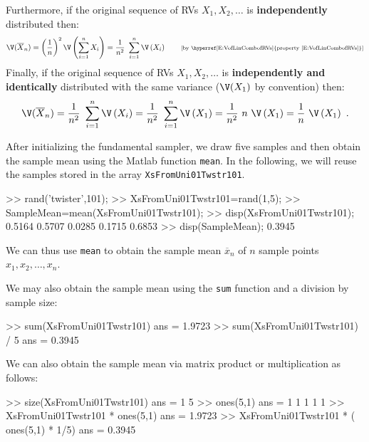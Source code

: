 Furthermore, if the original sequence of RVs $X_1,X_2,\ldots$ is {\bf independently} distributed then:
\begin{eqnarray}
\V(\overline{X}_n)
= \left( \frac{1}{n} \right)^2 \V \left(  \sum_{i=1}^n X_i \right)
=  \frac{1}{n^2} \ \sum_{i=1}^n \V \left( X_i \right) \qquad \text{{\scriptsize [by \hyperref[E:VofLinCombofRVs]{property \eqref{E:VofLinCombofRVs}}]}} \notag
\end{eqnarray}
Finally, if the original sequence of RVs $X_1,X_2,\ldots$ is {\bf independently and identically} distributed with the same variance ($\V(X_1)$ by convention) then:
\begin{equation}\label{E:VarOfSampleMeanOfIIDSeq}
\V(\overline{X}_n)
=  \frac{1}{n^2} \ \sum_{i=1}^n \V \left( X_i \right)
= \frac{1}{n^2} \ \sum_{i=1}^n \V \left( X_1 \right)
=  \frac{1}{n^2} \ n \ \V \left( X_1 \right)
=  \frac{1}{n} \ \V \left( X_1 \right) \ .
\end{equation}

\begin{labwork}\label{LW:XsFromUni01Twstr101mean}
After initializing the fundamental sampler, we draw five samples and then obtain the sample mean using the {\sc Matlab} function {\tt mean}.  In the following, we will reuse the samples stored in the array {\tt XsFromUni01Twstr101}.
\begin{VrbM}
>> rand('twister',101); %
>> XsFromUni01Twstr101=rand(1,5); %
>> SampleMean=mean(XsFromUni01Twstr101);%
>> disp(XsFromUni01Twstr101); %
    0.5164    0.5707    0.0285    0.1715    0.6853
>> disp(SampleMean); %
    0.3945
\end{VrbM}
We can thus use {\tt mean} to obtain the sample mean $\overline{x}_n$ of $n$ sample points $x_1,x_2,\ldots,x_n$.

We may also obtain the sample mean using the {\tt sum} function and a division by sample size:
\begin{VrbM}
>> sum(XsFromUni01Twstr101) %
ans =    1.9723
>> sum(XsFromUni01Twstr101) / 5 %
ans =    0.3945
\end{VrbM}

We can also obtain the sample mean via matrix product or multiplication as follows:
\begin{VrbM}
>> size(XsFromUni01Twstr101) %
ans =     1     5
>> ones(5,1) %
ans =
     1
     1
     1
     1
     1
>> XsFromUni01Twstr101 * ones(5,1) %
ans =    1.9723
>> XsFromUni01Twstr101 * ( ones(5,1) * 1/5) %
ans =    0.3945
\end{VrbM}
\end{labwork}

